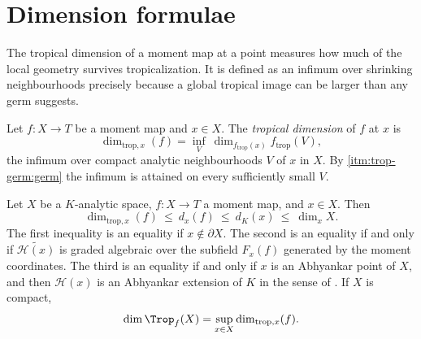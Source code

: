 \section{Dimension formulae}
\label{sec:trop-dimension}

The tropical dimension of a moment map at a point measures how much of the
local geometry survives tropicalization. It is defined as an infimum over
shrinking neighbourhoods precisely because a global tropical image can be
larger than any germ suggests.

\begin{definition}
\label{def:trop-tropical-dimension}
Let $f:X\to T$ be a moment map and $x\in X$. The \emph{tropical dimension}
of $f$ at $x$ is
\[
 \dim_{\mathrm{trop},x}(f)
 =\inf_V\ \dim_{f_{\mathrm{trop}}(x)}f_{\mathrm{trop}}(V),
\]
the infimum over compact analytic neighbourhoods $V$ of $x$ in $X$. By
 \cref{itm:trop-germ:germ} the infimum is attained
on every sufficiently small $V$.
\end{definition}

\begin{theorem}
\label{thm:trop-dimension-formula}
Let $X$ be a $K$-analytic space, $f:X\to T$ a moment map, and $x\in X$.
Then
\begin{equation}
\label{eq:trop-dimension-chain}
 \dim_{\mathrm{trop},x}(f)\ \le\ d_x(f)\ \le\ d_K(x)\ \le\ \dim_xX .
\end{equation}
The first inequality is an equality if $x\notin\partial X$. The second is an
equality if and only if $\widetilde{\mathcal H(x)}$ is graded algebraic over
the subfield $F_x(f)$ generated by the moment coordinates. The third is an
equality if and only if $x$ is an Abhyankar point of $X$, and then
$\mathcal H(x)$ is an Abhyankar extension of $K$ in the sense of
. If $X$ is compact,
\begin{equation}
\label{eq:trop-dimension-sup}
 \dim\Trop_f(X)=\sup_{x\in X}\dim_{\mathrm{trop},x}(f).
\end{equation}
\end{theorem}

